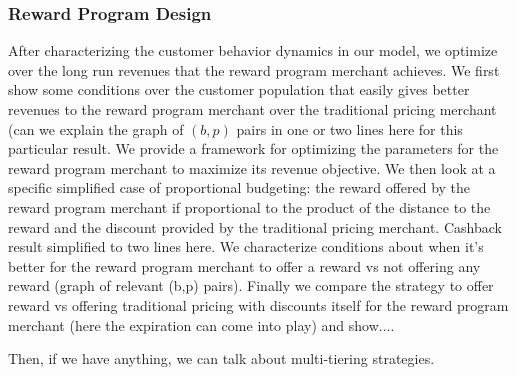 \subsubsection{Reward Program Design}
After characterizing the customer behavior dynamics in our model, we optimize over the long run revenues that the reward program merchant achieves.
We first show some conditions over the customer population that easily gives better revenues to the reward program merchant over the traditional pricing merchant {\arpit(can we explain the graph of $(b,p)$ pairs in one or two lines here for this particular result.}
We provide a framework for optimizing the parameters for the reward program merchant to maximize its revenue objective.
We then look at a specific simplified case of proportional budgeting: the reward offered by the reward program merchant if proportional to the product of the distance to the reward and the discount provided by the traditional pricing merchant.
{\arpit Cashback result simplified to two lines here}.
We characterize conditions about when it's better for the reward program merchant to offer a reward vs not offering any reward {\arpit(graph of relevant (b,p) pairs)}. 
Finally we compare the strategy to offer reward vs offering traditional pricing with discounts itself for the reward program merchant {\arpit(here the expiration can come into play) and show...}.

{\arpit Then, if we have anything, we can talk about multi-tiering strategies.}
